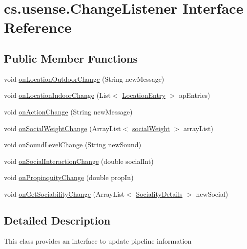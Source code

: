 \hypertarget{interfacecs_1_1usense_1_1_change_listener}{}\section{cs.\+usense.\+Change\+Listener Interface Reference}
\label{interfacecs_1_1usense_1_1_change_listener}
\subsection*{Public Member Functions}
\begin{DoxyCompactItemize}
\item 
void \hyperlink{interfacecs_1_1usense_1_1_change_listener_a8de89c0dc19b699dc690e721d458a0b0}{on\+Location\+Outdoor\+Change} (String new\+Message)
\item 
void \hyperlink{interfacecs_1_1usense_1_1_change_listener_a84808e13cf78f0159a19532eb36d9fd4}{on\+Location\+Indoor\+Change} (List$<$ \hyperlink{classcs_1_1usense_1_1location_1_1_location_entry}{Location\+Entry} $>$ ap\+Entries)
\item 
void \hyperlink{interfacecs_1_1usense_1_1_change_listener_af111fba03b42749c9124c4172c0b2b1a}{on\+Action\+Change} (String new\+Message)
\item 
void \hyperlink{interfacecs_1_1usense_1_1_change_listener_afbb48b60fca1127a7b7d41e5b6e476e8}{on\+Social\+Weight\+Change} (Array\+List$<$ \hyperlink{classcs_1_1usense_1_1bluetooth_1_1_bluetooth_core_1_1social_weight}{social\+Weight} $>$ array\+List)
\item 
void \hyperlink{interfacecs_1_1usense_1_1_change_listener_a99a76ba139be356ce19f06f21036faa0}{on\+Sound\+Level\+Change} (String new\+Sound)
\item 
void \hyperlink{interfacecs_1_1usense_1_1_change_listener_a9fe9d49594b17b0cc6e4031c15737742}{on\+Social\+Interaction\+Change} (double social\+Int)
\item 
void \hyperlink{interfacecs_1_1usense_1_1_change_listener_aba502b7a4a09dd7ed033a86e76da22bc}{on\+Propinquity\+Change} (double prop\+In)
\item 
void \hyperlink{interfacecs_1_1usense_1_1_change_listener_ac656aeac03715ad86719090183be502e}{on\+Get\+Sociability\+Change} (Array\+List$<$ \hyperlink{classcs_1_1usense_1_1inference_module_1_1_sociality_details}{Sociality\+Details} $>$ new\+Social)
\end{DoxyCompactItemize}


\subsection{Detailed Description}
This class provides an interface to update pipeline information 

